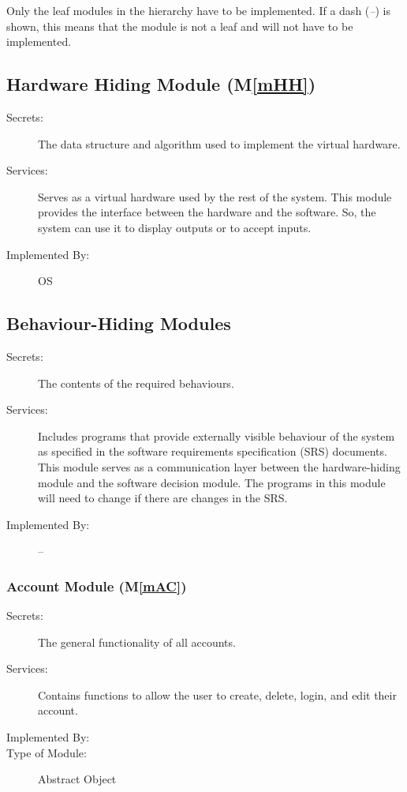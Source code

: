 \documentclass[12pt, titlepage]{article}
\newcommand{\mref}[1]{M\ref{#1}}
\begin{document}
Only the leaf modules in the hierarchy have to be implemented. If a dash
(\emph{--}) is shown, this means that the module is not a leaf and will not
have to be implemented.

\subsection{Hardware Hiding Module (\mref{mHH})}

\begin{description}
  \item[Secrets:]The data structure and algorithm used to implement the
  virtual hardware.
  \item[Services:]Serves as a virtual hardware used by the rest of the
  system. This module provides the interface between the hardware and the
  software. So, the system can use it to display outputs or to accept inputs.
  \item[Implemented By:] OS
\end{description}

\subsection{Behaviour-Hiding Modules}

\begin{description}
  \item[Secrets:]The contents of the required behaviours.
  \item[Services:]Includes programs that provide externally visible behaviour
  of the system as specified in the software requirements specification (SRS)
  documents. This module serves as a communication layer between the
  hardware-hiding module and the software decision module. The programs in
  this module will need to change if there are changes in the SRS.
  \item[Implemented By:] --
\end{description}

\subsubsection{Account Module (\mref{mAC})}

\begin{description}
  \item[Secrets:]The general functionality of all accounts.
  \item[Services:]Contains functions to allow the user to create, delete,
  login, and edit their \progname{} account.
  \item[Implemented By:] \progname{}
  \item[Type of Module:] Abstract Object
\end{description}
\end{document}
